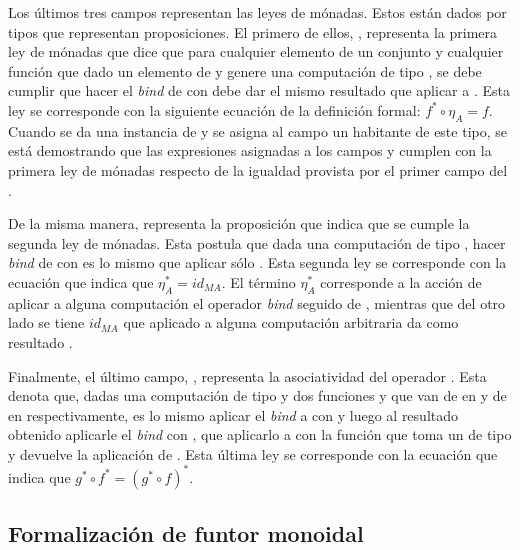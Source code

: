 Los últimos tres campos representan las leyes de mónadas. Estos están dados por tipos que representan proposiciones. El primero de ellos, , representa la primera ley de mónadas que dice que para cualquier elemento  de un conjunto  y cualquier función  que dado un elemento de  y genere una computación de tipo , se debe cumplir que hacer el \textit{bind} de   con  debe dar el mismo resultado que aplicar  a . Esta ley se corresponde con la siguiente ecuación de la definición formal: $f^* \circ \eta_A = f$. Cuando se da una instancia de  y se asigna al campo  un habitante de este tipo, se está demostrando que las expresiones asignadas a los campos  y \AgdaField{$\_\gg=\_$} cumplen con la primera ley de mónadas respecto de la igualdad provista por el primer campo del .

De la misma manera,  representa la proposición que indica que se cumple la segunda ley de mónadas. Esta postula que dada una computación  de tipo , hacer \textit{bind} de  con  es lo mismo que aplicar sólo . Esta segunda ley se corresponde con la ecuación que indica que $\eta_A^* = id_{M A}$. El término $\eta_A^*$ corresponde a la acción de aplicar a alguna computación  el operador \textit{bind} seguido de , mientras que del otro lado se tiene $id_{M A}$ que aplicado a alguna computación arbitraria  da como resultado .

Finalmente, el último campo, , representa la asociatividad del operador \hbox{\AgdaField{$\_\gg=\_$}}. Esta denota que, dadas una computación  de tipo  y dos funciones  y  que van de  en \hbox{} y de  en  respectivamente, es lo mismo aplicar el \textit{bind} a  con  y luego al resultado obtenido aplicarle el \textit{bind} con , que aplicarlo a  con la función que toma un  de tipo  y devuelve la aplicación de  \AgdaField{$\gg=$} . Esta última ley se corresponde con la ecuación que indica que $g^* \circ f^* = (g^* \circ f)^*$. 

\subsection{Formalización de funtor monoidal}\label{funtmon:funt}

